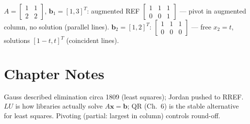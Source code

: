 \begin{example}
$A=\begin{bmatrix}1&1\\2&2\end{bmatrix}$, $\mathbf{b}_1=[1,3]^T$: augmented REF $\begin{bmatrix}1&1&1\\0&0&1\end{bmatrix}$ --- pivot in augmented column, no solution (parallel lines). $\mathbf{b}_2=[1,2]^T$: $\begin{bmatrix}1&1&1\\0&0&0\end{bmatrix}$ --- free $x_2=t$, solutions $[1-t,t]^T$ (coincident lines).
\end{example}


\section{Chapter Notes}
Gauss described elimination circa 1809 (least squares); Jordan pushed to RREF. $LU$ is how libraries actually solve $A\mathbf{x}=\mathbf{b}$; QR (Ch.~6) is the stable alternative for least squares. Pivoting (partial: largest in column) controls round-off.

